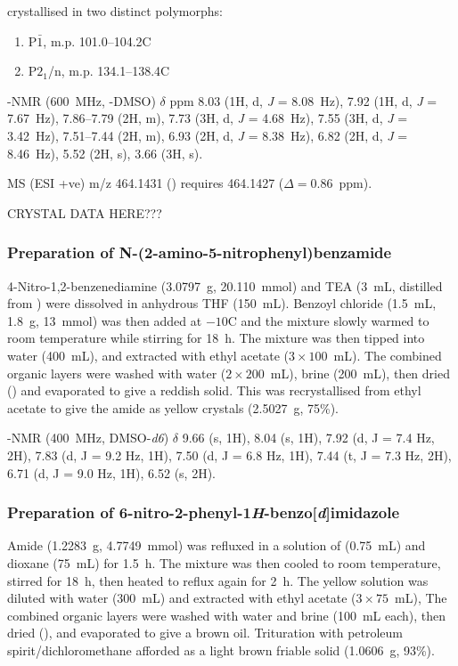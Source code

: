 \begin{refsection}
 crystallised in two distinct polymorphs:
\begin{enumerate}
    \item P$\bar{1}$, m.p. 101.0--104.2\degree{}C
    \item P$2_1$/n, m.p. 134.1--138.4\degree{}C
\end{enumerate}

-NMR (600~MHz, -DMSO) $\delta$ ppm 8.03 (1H, d, \emph{J} = 8.08~Hz), 7.92 (1H, d, \emph{J} = 7.67~Hz), 7.86--7.79 (2H, m), 7.73 (3H, d, \emph{J} = 4.68~Hz), 7.55 (3H, d, \emph{J} = 3.42~Hz), 7.51--7.44 (2H, m), 6.93 (2H, d, \emph{J} = 8.38~Hz), 6.82 (2H, d, \emph{J} = 8.46~Hz), 5.52 (2H, s), 3.66 (3H, s).

MS (ESI +ve) m/z 464.1431 ()  requires 464.1427 ($\Delta=0.86$~ppm).

CRYSTAL DATA HERE???

\subsubsection[Preparation of \refcmpd{rhs-nitro-amide}]{Preparation of N-(2-amino-5-nitrophenyl)benzamide }
4-Nitro-1,2-benzenediamine (3.0797~g, 20.110~mmol) and TEA (3~mL, distilled from ) were dissolved in anhydrous THF (150~mL).
Benzoyl chloride (1.5~mL, 1.8~g, 13~mmol) was then added at $-10$\degree{}C and the mixture slowly warmed to room temperature while stirring for 18~h.
The mixture was then tipped into water (400~mL), and extracted with ethyl acetate ($3\times100$~mL).
The combined organic layers were washed with water ($2\times200$~mL), brine (200~mL), then dried () and evaporated to give a reddish solid.
This was recrystallised from ethyl acetate to give the amide  as yellow crystals (2.5027~g, 75\%).

-NMR (400~MHz, DMSO-\emph{d6}) $\delta$ 9.66 (s, 1H), 8.04 (s, 1H), 7.92 (d, J = 7.4 Hz, 2H), 7.83 (d, J = 9.2 Hz, 1H), 7.50 (d, J = 6.8 Hz, 1H), 7.44 (t, J = 7.3 Hz, 2H), 6.71 (d, J = 9.0 Hz, 1H), 6.52 (s, 2H).

\subsubsection[Preparation of \refcmpd{rhs-nitro}]{Preparation of 6-nitro-2-phenyl-1\emph{H}-benzo[\emph{d}]imidazole }
Amide  (1.2283~g, 4.7749~mmol) was refluxed in a solution of  (0.75~mL) and dioxane (75~mL) for 1.5~h.
The mixture was then cooled to room temperature, stirred for 18~h, then heated to reflux again for 2~h.
The yellow solution was diluted with water (300~mL) and extracted with ethyl acetate ($3\times75$~mL),
The combined organic layers were washed with water and brine (100~mL each), then dried (), and evaporated to give a brown oil.
Trituration with petroleum spirit/dichloromethane afforded  as a light brown friable solid (1.0606~g, 93\%).


\end{refsection}
